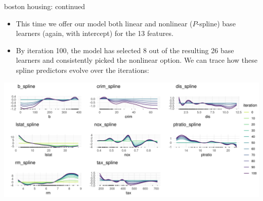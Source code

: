 
\begin{vbframe}{boston housing: continued}

\begin{itemize}
  \small
  \item This time we offer our model both 
  linear and nonlinear ($P$-spline) base learners (again, with intercept) for 
  the 13 features.
  \item By iteration 100, the model has selected 8 out of the resulting 26 base 
  learners and consistently picked the nonlinear option.
  We can trace how these spline predictors evolve over the iterations:
\end{itemize}

\vfill

\begin{center}
\includegraphics[width = \textwidth]{figure/compboost-illustration-3.png}
\end{center}



\end{vbframe}


